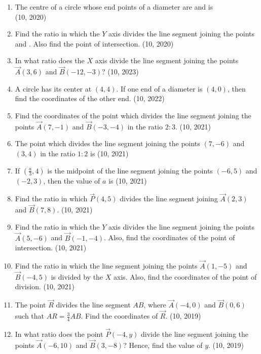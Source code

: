 \begin{enumerate}[label=\thesubsection.\arabic*,ref=\thesubsection.\theenumi]
\item The centre of a circle whose end points of a diameter are  and  is
	\\
\hfill (10, 2020)
\item Find the ratio in which the $Y$ axis  divides the line segment joining the points  and . Also find the point of intersection.
\hfill (10, 2020)
    \item In what ratio does the $X$ axis divide the line segment joining the points $\vec{A}(3,6)$ and $\vec{B}(-12, -3)$?
    \hfill (10, 2023)
    \item A circle has its center at $(4,4)$. If one end of a diameter is $(4,0)$, then find the coordinates of the other end.
    \hfill (10, 2022)
	\item Find the coordinates of the point which divides the line segment joining the points $\vec{A}(7, -1)$ and $\vec{B}(-3, -4)$ in the ratio $2:3$. \hfill (10, 2021)
		\item The point which divides the line segment joining the points $(7, -6)$ and $(3, 4)$ in the ratio $1:2$ is
		\hfill (10, 2021)
		\item If $\left(\frac{a}{3}, 4\right)$ is the midpoint of the line segment joining the points $(-6, 5)$ and $(-2, 3)$, then the value of $a$ is
		\hfill (10, 2021)
		\item Find the ratio in which $\vec{P}(4, 5)$ divides the line segment joining $\vec{A}(2, 3)$ and $\vec{B}(7, 8)$. \hfill (10, 2021)
		\item Find the ratio in which the $Y$ axis divides the line segment joining the points $\vec{A}(5, -6)$ and $\vec{B}(-1, -4)$. Also, find the coordinates of the point of intersection. \hfill (10, 2021)
		\item Find the ratio in which the line segment joining the points $\vec{A}(1, -5)$ and $\vec{B}(-4, 5)$ is divided by the $X$ axis. Also, find the coordinates of the point of division. \hfill (10, 2021)
\item The point $\vec{R}$ divides the line segment $AB$, where $\vec{A}(-4, 0)$ and $\vec{B}(0, 6)$ such that $AR = \frac{3}{4} AB$. Find the coordinates of $\vec{R}$. \hfill (10, 2019)
\item In what ratio does the point $\vec{P}(-4, y)$ divide the line segment joining the points $\vec{A}(-6, 10)$ and $\vec{B}(3, -8)$? Hence, find the value of $y$. \hfill (10, 2019)

\end{enumerate}
